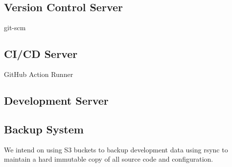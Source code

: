 \documentclass{article}
\begin{document}
\subsection{Version Control Server} git-scm

\subsection{CI/CD Server} GitHub Action Runner

\subsection{Development Server}

\subsection{Backup System} We intend on using S3 buckets to backup development data using rsync to maintain a hard immutable copy of all source code and configuration.
\end{document}

